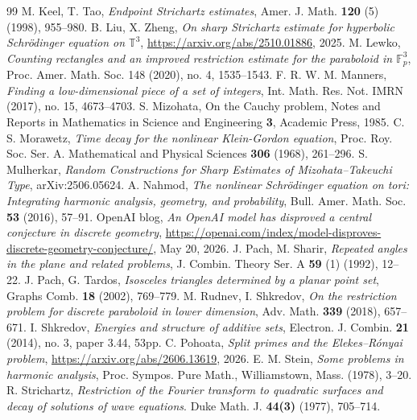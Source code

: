 \documentclass[10pt,a4paper]{amsart}
\numberwithin{equation}{section}
\begin{document}
\begin{thebibliography}{99}
 M. Keel, T. Tao, \textit{Endpoint Strichartz estimates}, Amer. J. Math. \textbf{120} (5) (1998), 955--980.
 B. Liu, X. Zheng, \textit{On sharp Strichartz estimate for hyperbolic Schr\"{o}dinger equation on $\mathbb{T}^3$}, \url{https://arxiv.org/abs/2510.01886}, 2025.
 M. Lewko, \textit{Counting rectangles and an improved restriction estimate for the paraboloid in $\mathbb{F}^3_p$}, Proc. Amer. Math. Soc. 148 (2020), no. 4, 1535--1543.
 F. R. W. M. Manners, \textit{Finding a low-dimensional piece of a set of integers}, Int. Math. Res. Not. IMRN (2017), no. 15, 4673--4703.
 S. Mizohata, On the Cauchy problem, Notes and Reports in Mathematics in Science and Engineering \textbf{3}, Academic Press, 1985.
 C. S. Morawetz, \textit{Time decay for the nonlinear Klein-Gordon equation}, Proc. Roy. Soc. Ser. A. Mathematical and Physical Sciences \textbf{306} (1968), 261--296.
 S. Mulherkar, \textit{Random Constructions for Sharp Estimates of Mizohata--Takeuchi Type}, arXiv:2506.05624.
 A. Nahmod, \textit{The nonlinear Schr\"{o}dinger equation on tori: Integrating harmonic analysis, geometry, and probability}, Bull. Amer. Math. Soc. \textbf{53} (2016), 57--91.
 OpenAI blog, \textit{An OpenAI model has disproved a central conjecture in discrete geometry}, \url{https://openai.com/index/model-disproves-discrete-geometry-conjecture/}, May 20, 2026.
 J. Pach, M. Sharir, \textit{Repeated angles in the plane and related problems}, J. Combin. Theory Ser. A \textbf{59} (1) (1992), 12--22.
 J. Pach, G. Tardos, \textit{Isosceles triangles determined by a planar point set}, Graphs Comb. \textbf{18} (2002), 769--779.
 M. Rudnev, I. Shkredov, \textit{On the restriction problem for discrete paraboloid in lower dimension}, Adv. Math. \textbf{339} (2018), 657--671.
 I. Shkredov, \textit{Energies and structure of additive sets}, Electron. J. Combin. \textbf{21} (2014), no. 3, paper 3.44, 53pp.
 C. Pohoata, \textit{Split primes and the Elekes--R\'{o}nyai problem}, \url{https://arxiv.org/abs/2606.13619}, 2026.
 E. M. Stein, \textit{Some problems in harmonic analysis}, Proc. Sympos. Pure Math., Williamstown, Mass. (1978), 3--20.
 R. Strichartz, \textit{Restriction of the Fourier transform to quadratic surfaces and decay of solutions of wave equations}. Duke Math. J. \textbf{44(3)} (1977), 705--714.

\end{thebibliography}
\end{document}
